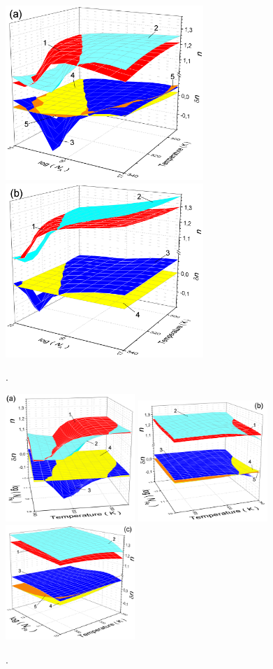 \documentclass[12pt]{article}
\begin{document}
\begin{figure}
\includegraphics[width=7.5cm]{FigFe100d24} \hfill
\includegraphics[width=7.5cm]{FigFe103d24}
\caption{.
}
\label{FigTNa}
\end{figure}

\begin{figure}
\includegraphics[width=4.9cm]{FigB105d15} \hfill
\includegraphics[width=4.9cm]{FigB106d15} \hfill
\includegraphics[width=4.9cm]{FigB107d15}
\caption{.
}
\label{FigTNfe}
\end{figure}
\end{document}

